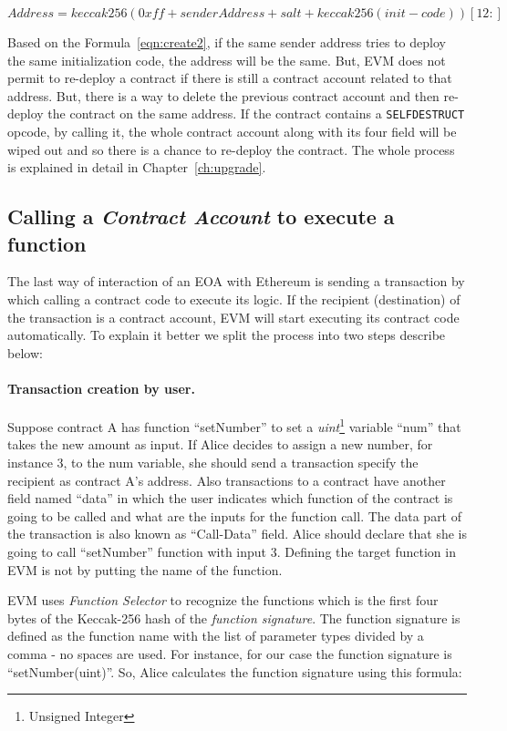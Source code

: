 \begin{equation}
    \label{eqn:create2}
    Address = keccak256(0xff + senderAddress + salt + keccak256(init-code))[12:]    
\end{equation}

Based on the Formula~\ref{eqn:create2}, if the same sender address tries to deploy the same initialization code, the address will be the same. But, EVM does not permit to re-deploy a contract if there is still a contract account related to that address. But, there is a way to delete the previous contract account and then re-deploy the contract on the same address. If the contract contains a \texttt{SELFDESTRUCT} opcode, by calling it, the whole contract account along with its four field will be wiped out and so there is a chance to re-deploy the contract. The whole process is explained in detail in Chapter~\ref{ch:upgrade}. 

\subsection{Calling a \textit{Contract Account} to execute a function}
The last way of interaction of an EOA with Ethereum is sending a transaction by which calling a contract code to execute its logic. If the recipient (destination) of the transaction is a contract account, EVM will start executing its contract code automatically. To explain it better we split the process into two steps describe below:

\paragraph{Transaction creation by user. }Suppose contract A has function ``setNumber'' to set a \textit{uint}\footnote{Unsigned Integer} variable ``num'' that takes the new amount as input. If Alice decides to assign a new number, for instance 3, to the num variable, she should send a transaction specify the recipient as contract A's address. Also transactions to a contract have another field named ``data'' in which the user indicates which function of the contract is going to be called and what are the inputs for the function call. The data part of the transaction is also known as ``Call-Data'' field. Alice should declare that she is going to call ``setNumber'' function with input 3. Defining the target function in EVM is not by putting the name of the function. 

EVM uses \textit{Function Selector} to recognize the functions which is the first four bytes of the Keccak-256 hash of the \textit{function signature}. The function signature is defined as the function name with the list of parameter types divided by a comma - no spaces are used. For instance, for our case the function signature is ``setNumber(uint)''. So, Alice calculates the function signature using this formula:

